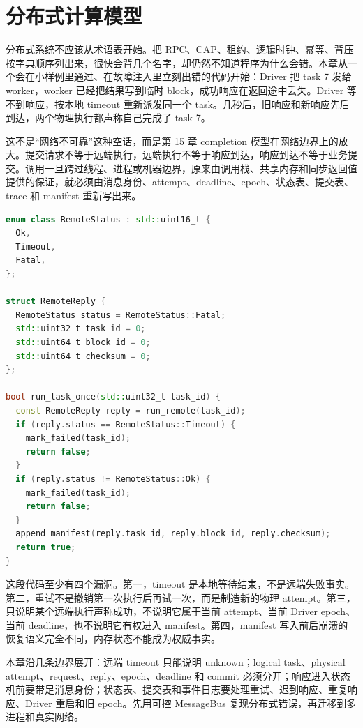 \chapter{分布式计算模型}

分布式系统不应该从术语表开始。把 RPC、CAP、租约、逻辑时钟、幂等、背压按字典顺序列出来，很快会背几个名字，却仍然不知道程序为什么会错。本章从一个会在小样例里通过、在故障注入里立刻出错的代码开始：Driver 把 task 7 发给 worker，worker 已经把结果写到临时 block，成功响应在返回途中丢失。Driver 等不到响应，按本地 timeout 重新派发同一个 task。几秒后，旧响应和新响应先后到达，两个物理执行都声称自己完成了 task 7。

这不是“网络不可靠”这种空话，而是第 15 章 completion 模型在网络边界上的放大。提交请求不等于远端执行，远端执行不等于响应到达，响应到达不等于业务提交。调用一旦跨过线程、进程或机器边界，原来由调用栈、共享内存和同步返回值提供的保证，就必须由消息身份、attempt、deadline、epoch、状态表、提交表、trace 和 manifest 重新写出来。

\begin{lstlisting}[language=C++,caption={反例：把远端调用当成本地函数}]
enum class RemoteStatus : std::uint16_t {
  Ok,
  Timeout,
  Fatal,
};

struct RemoteReply {
  RemoteStatus status = RemoteStatus::Fatal;
  std::uint32_t task_id = 0;
  std::uint64_t block_id = 0;
  std::uint64_t checksum = 0;
};

bool run_task_once(std::uint32_t task_id) {
  const RemoteReply reply = run_remote(task_id);
  if (reply.status == RemoteStatus::Timeout) {
    mark_failed(task_id);
    return false;
  }
  if (reply.status != RemoteStatus::Ok) {
    mark_failed(task_id);
    return false;
  }
  append_manifest(reply.task_id, reply.block_id, reply.checksum);
  return true;
}
\end{lstlisting}

这段代码至少有四个漏洞。第一，timeout 是本地等待结束，不是远端失败事实。第二，重试不是撤销第一次执行后再试一次，而是制造新的物理 attempt。第三， 只说明某个远端执行声称成功，不说明它属于当前 attempt、当前 Driver epoch、当前 deadline，也不说明它有权进入 manifest。第四，manifest 写入前后崩溃的恢复语义完全不同，内存状态不能成为权威事实。

本章沿几条边界展开：远端 timeout 只能说明 unknown；logical task、physical attempt、request、reply、epoch、deadline 和 commit 必须分开；响应进入状态机前要带足消息身份；状态表、提交表和事件日志要处理重试、迟到响应、重复响应、Driver 重启和旧 epoch。先用可控 MessageBus 复现分布式错误，再迁移到多进程和真实网络。

